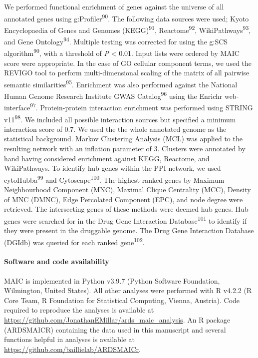 \documentclass[
  11,
  a4paper,
]{article}
\let\oldparagraph\paragraph
\renewcommand{\paragraph}[1]{\oldparagraph{#1}\mbox{}}
\begin{document}
We performed functional enrichment of genes against the universe of all
annotated genes using g:Profiler\textsuperscript{90}. The following data
sources were used; Kyoto Encyclopaedia of Genes and Genomes
(KEGG)\textsuperscript{91}, Reactome\textsuperscript{92},
WikiPathways\textsuperscript{93}, and Gene Ontology\textsuperscript{94}.
Multiple testing was corrected for using the g:SCS
algorithm\textsuperscript{90}, with a threshold of \emph{P} \textless{}
0.01. Input lists were ordered by MAIC score were appropriate. In the
case of GO cellular component terms, we used the REVIGO tool to perform
multi-dimensional scaling of the matrix of all pairwise semantic
similarities\textsuperscript{95}. Enrichment was also performed against
the National Human Genome Research Institute GWAS
Catalog\textsuperscript{96} using the Enrichr
web-interface\textsuperscript{97}. Protein-protein interaction
enrichment was performed using STRING v11\textsuperscript{98}. We
included all possible interaction sources but specified a minimum
interaction score of 0.7. We used the the whole annotated genome as the
statistical background. Markov Clustering Analysis (MCL) was applied to
the resulting network with an inflation parameter of 3. Clusters were
annotated by hand having considered enrichment against KEGG, Reactome,
and WikiPathways. To identify hub genes within the PPI network, we used
cytoHubba\textsuperscript{99} and Cytoscape\textsuperscript{100}. The
highest ranked genes by Maximum Neighbourhood Component (MNC), Maximal
Clique Centrality (MCC), Density of MNC (DMNC), Edge Percolated
Component (EPC), and node degree were retrieved. The intersecting genes
of these methods were deemed hub genes. Hub genes were searched for in
the Drug Gene Interaction Database\textsuperscript{101} to identify if
they were present in the druggable genome. The Drug Gene Interaction
Database (DGIdb) was queried for each ranked gene\textsuperscript{102}.

\paragraph{Software and code
availability}\label{software-and-code-availability}

MAIC is implemented in Python v3.9.7 (Python Software Foundation,
Wilmington, United States). All other analyses were performed with R
v4.2.2 (R Core Team, R Foundation for Statistical Computing, Vienna,
Austria). Code required to reproduce the analyses is available at
\url{https://github.com/JonathanEMillar/ards_maic_analysis}. An R
package (ARDSMAICR) containing the data used in this manuscript and
several functions helpful in analyses is available at
\url{https://github.com/baillielab/ARDSMAICr}.
\end{document}
